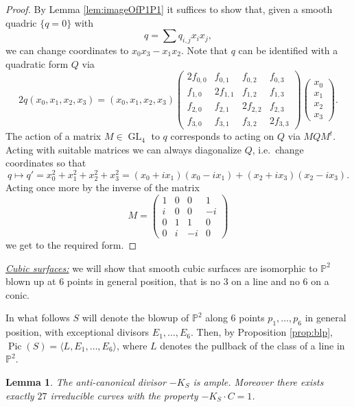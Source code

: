 \documentclass[a4paper,11pt]{amsart}
\newtheorem{lemma}[theorem]{Lemma}
\def\Pic{\operatorname{Pic}}
\def\GL{\operatorname{GL}}
\newcommand{\PP}{\mathbb{P}}
\begin{document}
\begin{proof}
	By Lemma \ref{lem:imageOfP1P1} it suffices to show that, given a smooth quadric $\{q = 0\}$ with
	\[
	q = \sum q_{i,j}x_ix_j,
	\]
	we can change coordinates to $x_0x_3 - x_1x_2$.
	Note that $q$ can be identified with a quadratic form $Q$ via
	\[
	2q(x_0,x_1,x_2,x_3) = (x_0,x_1,x_2,x_3)
	\left(
	\begin{array}{cccc}
		2f_{0,0} & f_{0,1} & f_{0,2} & f_{0,3}\\
		f_{1,0} & 2f_{1,1} & f_{1,2} & f_{1,3}\\
		f_{2,0} & f_{2,1} & 2f_{2,2} & f_{2,3}\\
		f_{3,0} & f_{3,1} & f_{3,2} & 2f_{3,3}
	\end{array}
	\right)
	\begin{pmatrix}
		x_0\\
		x_1\\
		x_2\\
		x_3
	\end{pmatrix}.
	\]
	The action of a matrix $M \in \GL_4$ to $q$ corresponds to acting on $Q$ via $M Q M^t$.
	Acting with suitable matrices we can always diagonalize $Q$, i.e.\ change coordinates so that
	\[
	q \mapsto q'= x_0^2 + x_1^2 + x_2^2 + x_3^2 = (x_0 + ix_1)(x_0 - ix_1) + (x_2 + ix_3)(x_2 - ix_3).
	\]
	Acting once more by the inverse of the matrix
	\[
	M = 
	\left(
	\begin{array}{rrrr}
		1 & 0 & 0 & 1\\
		i & 0 & 0 & -i\\
		0 & 1 & 1 & 0\\
		0 & i &-i & 0
	\end{array}
	\right)
	\]
	we get to the required form.
\end{proof}

\noindent\underline{\emph{Cubic surfaces:}} we will show that smooth cubic surfaces are isomorphic to $\PP^2$ blown up at $6$ points in general position, that is no $3$ on a line and no $6$ on a conic.
 
In what follows $S$ will denote the blowup of $\PP^2$ along $6$ points $p_1,\dots, p_6$ in general position, with exceptional divisors $E_1, \dots, E_6$.
Then, by Proposition \ref{prop:blp}, $\Pic(S) = \langle L, E_1, \dots, E_6 \rangle$, where $L$ denotes the pullback of the class of a line in $\PP^2$.

\begin{lemma}\label{lem:antiCanAmple}
	The anti-canonical divisor $-K_S$ is ample.
	Moreover there exists exactly $27$ irreducible curves with the property $-K_S \cdot C = 1$.
\end{lemma}
\end{document}
